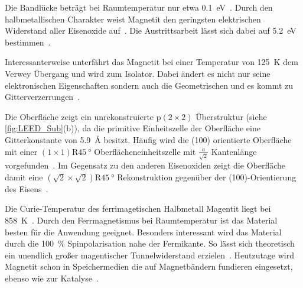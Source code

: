             Die Bandlücke beträgt bei Raumtemperatur nur etwa \SI{0.1}{\electronvolt}~\cite{FeO_23}. %
            Durch den halbmetallischen Charakter weist Magnetit den geringsten elektrischen Widerstand aller Eisenoxide auf~\cite{FeO_23}.
            Die Austrittsarbeit lässt sich dabei auf \SI{5.2}{\electronvolt} bestimmen~\cite{FeO_40}.

            Interessanterweise unterfährt das Magnetit bei einer Temperatur von \SI{125}{\kelvin} dem Verwey Übergang und wird zum Isolator.
            Dabei ändert es nicht nur seine elektronischen Eigenschaften sondern auch die Geometrischen und es kommt zu Gitterverzerrungen~\cite{cornell_iron_2003}.

            Die  Oberfläche zeigt ein unrekonstruierte $\text{p}(2\times 2)$ Überstruktur (siehe \autoref{fig:LEED_Sub}(b)), da die primitive Einheitszelle der Oberfläche eine Gitterkonstante von \SI{5.9}{\angstrom} besitzt.
            Häufig wird die (100) orientierte Oberfläche mit einer $(1\times 1)\text{R}\SI{45}{\degree}$ Oberflächeneinheitszelle mit $\frac{a}{\sqrt{2}}$ Kantenlänge vorgefunden~\cite{bus_studies_2015}.
            Im Gegensatz zu den anderen Eisenoxiden zeigt die Oberfläche damit eine $(\sqrt{2}\times\sqrt{2})\text{R}\SI{45}{\degree}$ Rekonstruktion gegenüber der (100)-Orientierung des Eisens~\cite{ruwisch_vsm-untersuchung_2016}.
            
            Die Curie-Temperatur des ferrimagetischen Halbmetall Magentit liegt bei \SI{858}{\kelvin}~\cite{nordmann_anfangsstadium_2014}. %
            Durch den Ferrmagnetismus bei Raumtemperatur  ist das Material besten für die Anwendung geeignet.
            Besonders interessant wird das Material durch die \SI{100}{\percent} Spinpolarisation nahe der Fermikante.
            So lässt sich theoretisch ein unendlich großer magentischer Tunnelwiderstand erzielen~\cite{nordmann_anfangsstadium_2014}.
            Heutzutage wird Magnetit schon in Speichermedien die auf Magnetbändern fundieren eingesetzt, ebenso wie zur Katalyse~\cite{zimmermann_epitaktisches_2010}.

